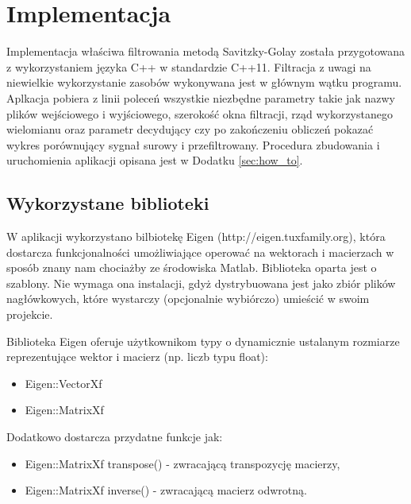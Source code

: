 \section{Implementacja}

Implementacja właściwa filtrowania metodą Savitzky-Golay została przygotowana z wykorzystaniem języka C++ w standardzie C++11. Filtracja z uwagi na niewielkie wykorzystanie zasobów wykonywana jest w głównym wątku programu. 
Aplkacja pobiera z linii poleceń wszystkie niezbędne parametry takie jak nazwy plików wejściowego i wyjściowego, szerokość okna filtracji, rząd wykorzystanego wielomianu oraz parametr decydujący czy po zakończeniu obliczeń pokazać wykres porównujący sygnał surowy i przefiltrowany. Procedura zbudowania i uruchomienia aplikacji opisana jest w Dodatku \ref{sec:how_to}.



\subsection{Wykorzystane biblioteki}
W aplikacji wykorzystano bilbiotekę Eigen (http://eigen.tuxfamily.org), która dostarcza funkcjonalności umożliwiające operować na wektorach i macierzach w sposób znany nam chociażby ze środowiska Matlab. Biblioteka oparta jest o szablony. Nie wymaga ona instalacji, gdyż dystrybuowana jest jako zbiór plików nagłówkowych, które wystarczy (opcjonalnie wybiórczo) umieścić w swoim projekcie.

Biblioteka Eigen oferuje użytkownikom typy o dynamicznie ustalanym rozmiarze reprezentujące wektor i macierz (np. liczb typu float):
\begin{itemize}
  \item Eigen::VectorXf
  \item Eigen::MatrixXf
\end{itemize}

Dodatkowo dostarcza przydatne funkcje jak:
\begin{itemize}
  \item Eigen::MatrixXf transpose() - zwracającą transpozycję macierzy,
  \item Eigen::MatrixXf inverse() - zwracającą macierz odwrotną.
\end{itemize}


